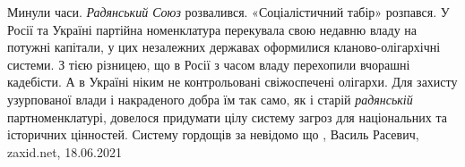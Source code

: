 Минули часи. \emph{Радянський Союз} розвалився. «Соціалістичний табір» розпався. У
Росії та Україні партійна номенклатура перекувала свою недавню владу на потужні
капітали, у цих незалежних державах оформилися кланово-олігархічні системи. З
тією різницею, що в Росії з часом владу перехопили вчорашні кадебісти. А в
Україні ніким не контрольовані свіжоспечені олігархи. Для захисту узурпованої
влади і накраденого добра їм так само, як і старій \emph{радянській} партноменклатурі,
довелося придумати цілу систему загроз для національних та історичних
цінностей. Систему гордощів за невідомо що
, 
Василь Расевич, zaxid.net, 18.06.2021


